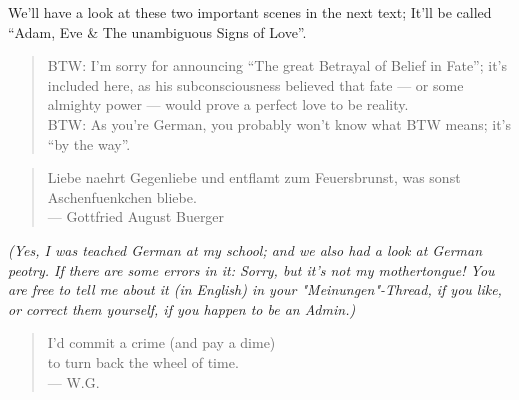 We'll have a look at these two important scenes in the next text; It'll be called \enquote{Adam, Eve \& The unambiguous Signs of Love}.

\begin{quote}
BTW: I'm sorry for announcing \enquote{The great Betrayal of Belief in Fate}; it's included here, as his subconsciousness believed that fate --- or some almighty power --- would prove a perfect love to be reality.\\
BTW: As you're German, you probably won't know what BTW means; it's \enquote{by the way}. 
\end{quote}

\begin{quote}
Liebe naehrt Gegenliebe und entflamt zum Feuersbrunst, was sonst Aschenfuenkchen bliebe.\\
--- Gottfried August Buerger\\
\end{quote}
\emph{(Yes, I was teached German at my school; and we also had a look at German peotry. If there are some errors in it: Sorry, but it's not my mothertongue! You are free to tell me about it (in English) in your "Meinungen"-Thread, if you like, or correct them yourself, if you happen to be an Admin.)}  

\begin{quote}
I'd commit a crime (and pay a dime)\\
to turn back the wheel of time.\\
--- W.G.  
\end{quote}
